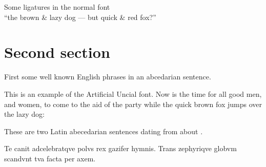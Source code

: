 \documentclass{article}
\newcommand{\Romannum}[1]{\uppercase\expandafter{\romannumeral #1}}
\newcommand{\Sentence}{%
This is an example of the Artificial Uncial font. Now is the time for all good
men, and women, to come to the aid of the party while the quick brown fox
jumps over the lazy dog:}
\newcommand{\latin}{Te canit adcelebratqve polvs rex gazifer hymnis.
  Trans zephyriqve globvm scandvnt tva facta per axem.}
\begin{document}
\begin{center}
    Some ligatures in the normal font \\
{``the brown \& lazy dog --- but quick \& red fox?''}
\end{center}

\section{Second section}

    First some well known English phrases in an abcedarian sentence.

\Sentence{}

    These are two Latin abecedarian sentences dating from about 
\Romannum{790}.

\latin{}

\end{document}
